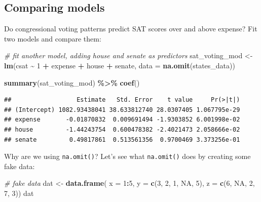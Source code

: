 \documentclass[
]{book}
\newenvironment{Shaded}{\begin{snugshade}}{\end{snugshade}}
\newcommand{\CommentTok}[1]{\textcolor[rgb]{0.56,0.35,0.01}{\textit{#1}}}
\newcommand{\DataTypeTok}[1]{\textcolor[rgb]{0.13,0.29,0.53}{#1}}
\newcommand{\DecValTok}[1]{\textcolor[rgb]{0.00,0.00,0.81}{#1}}
\newcommand{\KeywordTok}[1]{\textcolor[rgb]{0.13,0.29,0.53}{\textbf{#1}}}
\newcommand{\NormalTok}[1]{#1}
\newcommand{\OperatorTok}[1]{\textcolor[rgb]{0.81,0.36,0.00}{\textbf{#1}}}
\newcommand{\OtherTok}[1]{\textcolor[rgb]{0.56,0.35,0.01}{#1}}
\newcommand{\StringTok}[1]{\textcolor[rgb]{0.31,0.60,0.02}{#1}}
\begin{document}
\hypertarget{comparing-models}{%
\subsection{Comparing models}\label{comparing-models}}

Do congressional voting patterns predict SAT scores over and above expense? Fit two models and compare them:

\begin{Shaded}
\begin{Highlighting}[]
  \CommentTok{\# fit another model, adding house and senate as predictors}
\NormalTok{  sat\_voting\_mod \textless{}{-}}\StringTok{ }\KeywordTok{lm}\NormalTok{(csat }\OperatorTok{\textasciitilde{}}\StringTok{ }\DecValTok{1} \OperatorTok{+}\StringTok{ }\NormalTok{expense }\OperatorTok{+}\StringTok{ }\NormalTok{house }\OperatorTok{+}\StringTok{ }\NormalTok{senate,}
                        \DataTypeTok{data =} \KeywordTok{na.omit}\NormalTok{(states\_data))}

  \KeywordTok{summary}\NormalTok{(sat\_voting\_mod) }\OperatorTok{\%\textgreater{}\%}\StringTok{ }\KeywordTok{coef}\NormalTok{()}
\end{Highlighting}
\end{Shaded}

\begin{verbatim}
##                  Estimate   Std. Error    t value     Pr(>|t|)
## (Intercept) 1082.93438041 38.633812740 28.0307405 1.067795e-29
## expense       -0.01870832  0.009691494 -1.9303852 6.001998e-02
## house         -1.44243754  0.600478382 -2.4021473 2.058666e-02
## senate         0.49817861  0.513561356  0.9700469 3.373256e-01
\end{verbatim}

Why are we using \texttt{na.omit()}? Let's see what \texttt{na.omit()} does by creating some fake data:

\begin{Shaded}
\begin{Highlighting}[]
  \CommentTok{\# fake data}
\NormalTok{  dat \textless{}{-}}\StringTok{ }\KeywordTok{data.frame}\NormalTok{(}
    \DataTypeTok{x =} \DecValTok{1}\OperatorTok{:}\DecValTok{5}\NormalTok{,}
    \DataTypeTok{y =} \KeywordTok{c}\NormalTok{(}\DecValTok{3}\NormalTok{, }\DecValTok{2}\NormalTok{, }\DecValTok{1}\NormalTok{, }\OtherTok{NA}\NormalTok{, }\DecValTok{5}\NormalTok{),}
    \DataTypeTok{z =} \KeywordTok{c}\NormalTok{(}\DecValTok{6}\NormalTok{, }\OtherTok{NA}\NormalTok{, }\DecValTok{2}\NormalTok{, }\DecValTok{7}\NormalTok{, }\DecValTok{3}\NormalTok{))}
\NormalTok{  dat}
\end{Highlighting}
\end{Shaded}
\end{document}
